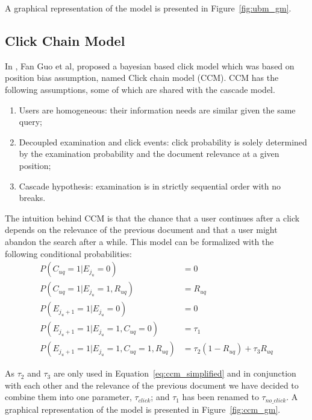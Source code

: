 A graphical representation of the model is presented in Figure~\ref{fig:ubm_gm}.

\subsection{Click Chain Model}
In \cite{Guo2009_CCM}, Fan Guo et al, proposed a bayesian based click model which was based on position bias assumption, named Click chain model (CCM). 
CCM has the following assumptions, some of which are shared with the cascade model.
\begin{enumerate}
	\item Users are homogeneous: their information needs are similar given the same query; 
	\item Decoupled examination and click events: click probability is solely determined by the examination probability and the document relevance at a given position; 
	\item Cascade hypothesis: examination is in strictly sequential order with no breaks.
\end{enumerate}

The intuition behind CCM is that the chance that a user continues after a click depends on the relevance of the previous document and that a user might abandon the search after a while. This model can be formalized with the following conditional probabilities:
\begin{align}
	P(C_{uq}=1|E_{j_u}=0) &= 0 \nonumber\\
	P(C_{uq}=1|E_{j_u}=1, R_{uq}) &= R_{uq} \nonumber\\
	P(E_{j_u+1}=1|E_{j_u}=0) &= 0 \nonumber\\
	P(E_{j_u+1}=1|E_{j_u}=1,C_{uq}=0) &= \tau_1 \nonumber\\
	P(E_{j_u+1}=1|E_{j_u}=1,C_{uq}=1,R_{uq}) &= \tau_2(1-R_{uq})+\tau_3 R_{uq} \label{eq:ccm_simplified}
\end{align}

As $\tau_2$ and $\tau_3$ are only used in Equation~\ref{eq:ccm_simplified} and in conjunction with each other and the relevance of the previous document we have decided to combine them into one parameter, $\tau_{click}$; and $\tau_1$ has been renamed to $\tau_{no\_click}$. A graphical representation of the model is presented in Figure~\ref{fig:ccm_gm}.

